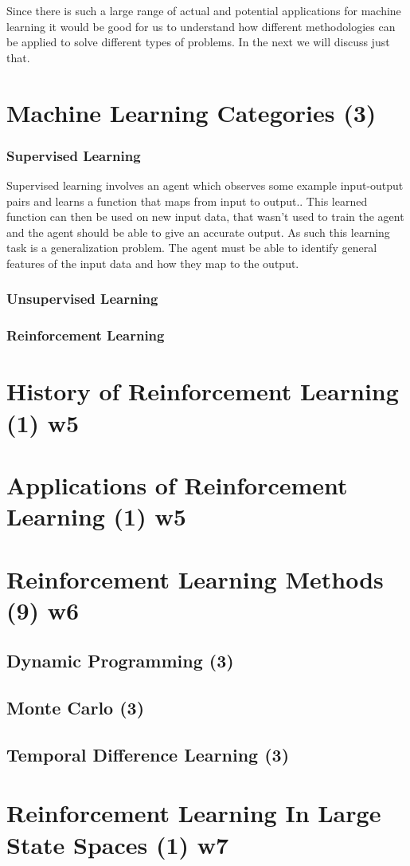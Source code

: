 Since there is such a large range of actual and potential applications for machine learning it would be good for
us to understand how different methodologies can be applied to solve different types of problems.
In the next we will discuss just that.


\section{Machine Learning Categories (3)}\label{sec:mlCategories}

\subsubsection{Supervised Learning}
Supervised learning involves an agent which observes some example input-output pairs and learns
a function that maps from input to output.\cite{russell2016artificial}.
This learned function can then be used on new input data, that wasn't used to train the agent and the
agent should be able to give an accurate output.
As such this learning task is a generalization problem.
The agent must be able to identify general features of the input data and how they map to the output.



\subsubsection{Unsupervised Learning}
\subsubsection{Reinforcement Learning}

\section{History of Reinforcement Learning (1) w5}\label{sec:rlhistory}


\section{Applications of Reinforcement Learning (1) w5}\label{sec:rlApplications}


\section{Reinforcement Learning Methods (9) w6}\label{sec:rlMethods}

\subsection{Dynamic Programming (3)}\label{subsec:dp}

\subsection{Monte Carlo (3)}\label{subsec:mc}

\subsection{Temporal Difference Learning (3)}\label{subsec:td}


\section{Reinforcement Learning In Large State Spaces (1) w7}\label{sec:rlLargeStateSpace}